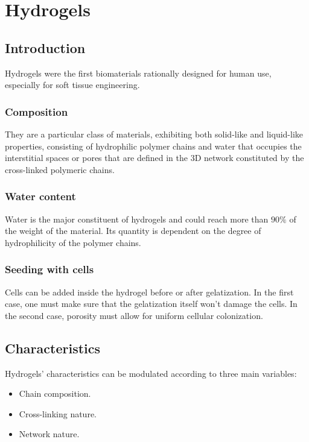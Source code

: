 \graphicspath{{chapters/06/images/}}
\chapter{Hydrogels}


\section{Introduction}
Hydrogels were the first biomaterials rationally designed for human use, especially for soft tissue engineering.

	\subsection{Composition}
	They are a particular class of materials, exhibiting both solid-like and liquid-like properties, consisting of hydrophilic polymer chains and water that occupies the interstitial spaces or pores that are defined in the 3D network constituted by the cross-linked polymeric chains.

	\subsection{Water content}
	Water is the major constituent of hydrogels and could reach more than $90\%$ of the weight of the material.
	Its quantity is dependent on the degree of hydrophilicity of the polymer chains.

	\subsection{Seeding with cells}
	Cells can be added inside the hydrogel before or after gelatization.
	In the first case, one must make sure that the gelatization itself won’t damage the cells.
	In the second case, porosity must allow for uniform cellular colonization.

\section{Characteristics}
Hydrogels’ characteristics can be modulated according to three main variables:

\begin{multicols}{3}
	\begin{itemize}
		\item Chain composition.
		\item Cross-linking nature.
		\item Network nature.
	\end{itemize}
\end{multicols}


